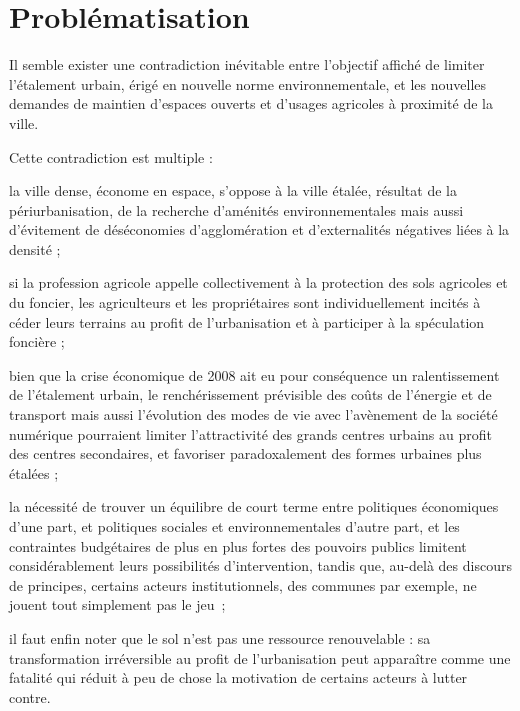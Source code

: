 \section[probleme]{Problématisation}

Il semble exister une contradiction inévitable entre l'objectif affiché de limiter
l'étalement urbain, érigé en nouvelle norme environnementale,
et les nouvelles demandes de maintien d'espaces ouverts
et d'usages agricoles à proximité de la ville.

Cette contradiction est multiple :

\startitemize[a]

\item la ville dense, économe en espace, s'oppose à la ville étalée,
	résultat de la périurbanisation, de la recherche d'aménités environnementales
	mais aussi d'évitement de déséconomies d'agglomération et d'externalités négatives
	liées à la densité ;

\item si la profession agricole appelle collectivement à la protection des sols agricoles
	et du foncier, les agriculteurs et les propriétaires sont individuellement
	incités à céder leurs terrains au profit de l'urbanisation et
	à participer à la spéculation foncière ;

\item bien que la crise économique de 2008 ait eu pour conséquence
	un ralentissement de l'étalement urbain,
	le renchérissement prévisible des coûts de l'énergie et de transport
	mais aussi l'évolution des modes de vie avec l'avènement de la société numérique
	pourraient limiter l'attractivité des grands centres urbains
	au profit des centres secondaires, et favoriser paradoxalement des formes urbaines
	plus étalées ;

\item la nécessité de trouver un équilibre de court terme entre politiques économiques
	d'une part, et politiques sociales et environnementales d'autre part, et les contraintes budgétaires de plus en plus fortes des pouvoirs publics
	limitent considérablement leurs possibilités d'intervention, tandis que,
	au-delà des discours de principes,
	certains acteurs institutionnels, des communes par exemple,
	ne jouent tout simplement pas le jeu~;

\item il faut enfin noter que le sol n'est pas une ressource renouvelable :
	sa transformation irréversible au profit de l'urbanisation peut apparaître comme une
	fatalité qui réduit à peu de chose la motivation de certains acteurs à lutter contre.

